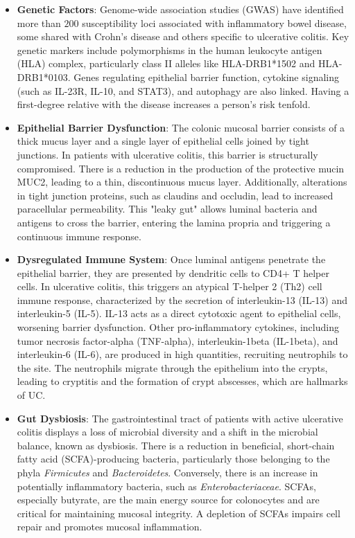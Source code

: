 \begin{itemize}
  \item \textbf{Genetic Factors}: Genome-wide association studies (GWAS) have identified more than $200$ susceptibility loci associated with inflammatory bowel disease, some shared with Crohn's disease and others specific to ulcerative colitis. Key genetic markers include polymorphisms in the human leukocyte antigen (HLA) complex, particularly class II alleles like HLA-DRB1*1502 and HLA-DRB1*0103. Genes regulating epithelial barrier function, cytokine signaling (such as IL-23R, IL-10, and STAT3), and autophagy are also linked. Having a first-degree relative with the disease increases a person's risk tenfold.
  \item \textbf{Epithelial Barrier Dysfunction}: The colonic mucosal barrier consists of a thick mucus layer and a single layer of epithelial cells joined by tight junctions. In patients with ulcerative colitis, this barrier is structurally compromised. There is a reduction in the production of the protective mucin MUC2, leading to a thin, discontinuous mucus layer. Additionally, alterations in tight junction proteins, such as claudins and occludin, lead to increased paracellular permeability. This "leaky gut" allows luminal bacteria and antigens to cross the barrier, entering the lamina propria and triggering a continuous immune response.
  \item \textbf{Dysregulated Immune System}: Once luminal antigens penetrate the epithelial barrier, they are presented by dendritic cells to CD4+ T helper cells. In ulcerative colitis, this triggers an atypical T-helper 2 (Th2) cell immune response, characterized by the secretion of interleukin-13 (IL-13) and interleukin-5 (IL-5). IL-13 acts as a direct cytotoxic agent to epithelial cells, worsening barrier dysfunction. Other pro-inflammatory cytokines, including tumor necrosis factor-alpha (TNF-alpha), interleukin-1beta (IL-1beta), and interleukin-6 (IL-6), are produced in high quantities, recruiting neutrophils to the site. The neutrophils migrate through the epithelium into the crypts, leading to cryptitis and the formation of crypt abscesses, which are hallmarks of UC.
  \item \textbf{Gut Dysbiosis}: The gastrointestinal tract of patients with active ulcerative colitis displays a loss of microbial diversity and a shift in the microbial balance, known as dysbiosis. There is a reduction in beneficial, short-chain fatty acid (SCFA)-producing bacteria, particularly those belonging to the phyla \textit{Firmicutes} and \textit{Bacteroidetes}. Conversely, there is an increase in potentially inflammatory bacteria, such as \textit{Enterobacteriaceae}. SCFAs, especially butyrate, are the main energy source for colonocytes and are critical for maintaining mucosal integrity. A depletion of SCFAs impairs cell repair and promotes mucosal inflammation.

\end{itemize}

